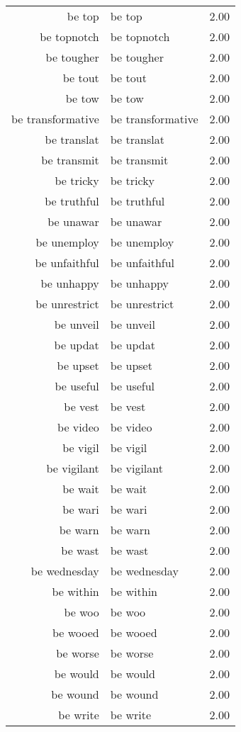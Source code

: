\begin{table}[ht]
\begin{tabular}{rlr}
  be top & be top & 2.00 \\ 
  be topnotch & be topnotch & 2.00 \\ 
  be tougher & be tougher & 2.00 \\ 
  be tout & be tout & 2.00 \\ 
  be tow & be tow & 2.00 \\ 
  be transformative & be transformative & 2.00 \\ 
  be translat & be translat & 2.00 \\ 
  be transmit & be transmit & 2.00 \\ 
  be tricky & be tricky & 2.00 \\ 
  be truthful & be truthful & 2.00 \\ 
  be unawar & be unawar & 2.00 \\ 
  be unemploy & be unemploy & 2.00 \\ 
  be unfaithful & be unfaithful & 2.00 \\ 
  be unhappy & be unhappy & 2.00 \\ 
  be unrestrict & be unrestrict & 2.00 \\ 
  be unveil & be unveil & 2.00 \\ 
  be updat & be updat & 2.00 \\ 
  be upset & be upset & 2.00 \\ 
  be useful & be useful & 2.00 \\ 
  be vest & be vest & 2.00 \\ 
  be video & be video & 2.00 \\ 
  be vigil & be vigil & 2.00 \\ 
  be vigilant & be vigilant & 2.00 \\ 
  be wait & be wait & 2.00 \\ 
  be wari & be wari & 2.00 \\ 
  be warn & be warn & 2.00 \\ 
  be wast & be wast & 2.00 \\ 
  be wednesday & be wednesday & 2.00 \\ 
  be within & be within & 2.00 \\ 
  be woo & be woo & 2.00 \\ 
  be wooed & be wooed & 2.00 \\ 
  be worse & be worse & 2.00 \\ 
  be would & be would & 2.00 \\ 
  be wound & be wound & 2.00 \\ 
  be write & be write & 2.00 \\ 

\end{tabular}
\end{table}
